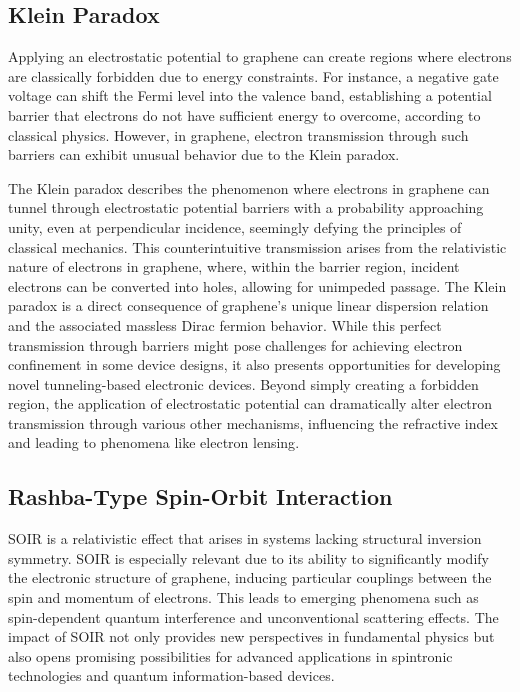 \subsection{Klein Paradox}\label{subsec:kleinParadox}

Applying an electrostatic potential to graphene can create regions where electrons are classically forbidden due to energy constraints\cite{SoninPhysRevB2009}.
For instance, a negative gate voltage can shift the Fermi level into the valence band, establishing a potential barrier that electrons do not have sufficient energy to overcome, according to classical physics\cite{DellAnnaJPhysCondMatt2018}.
However, in graphene, electron transmission through such barriers can exhibit unusual behavior due to the Klein paradox.

The Klein paradox describes the phenomenon where electrons in graphene can tunnel through electrostatic potential barriers with a probability approaching unity, even at perpendicular incidence, seemingly defying the principles of classical mechanics\cite{TrauzettelNature2007}.
This counterintuitive transmission arises from the relativistic nature of electrons in graphene, where, within the barrier region, incident electrons can be converted into holes, allowing for unimpeded passage\cite{BernardiniJPhysAMathTheor2010}.
The Klein paradox is a direct consequence of graphene's unique linear dispersion relation and the associated massless Dirac fermion behavior.
While this perfect transmission through barriers might pose challenges for achieving electron confinement in some device designs, it also presents opportunities for developing novel tunneling-based electronic devices.
Beyond simply creating a forbidden region, the application of electrostatic potential can dramatically alter electron transmission through various other mechanisms, influencing the refractive index and leading to phenomena like electron lensing\cite{ParedesPhysRevB2021}.

\subsection{Rashba-Type Spin-Orbit Interaction}\label{subsec:rashba-type-spin-orbit-interaction}

SOIR is a relativistic effect that arises in systems lacking structural inversion symmetry\cite{AvishaiPhysRevB2021}.
SOIR is especially relevant due to its ability to significantly modify the electronic structure of graphene, inducing particular couplings between the spin and momentum of electrons.
This leads to emerging phenomena such as spin-dependent quantum interference and unconventional scattering effects.
The impact of SOIR not only provides new perspectives in fundamental physics but also opens promising possibilities for advanced applications in spintronic technologies and quantum information-based devices.

